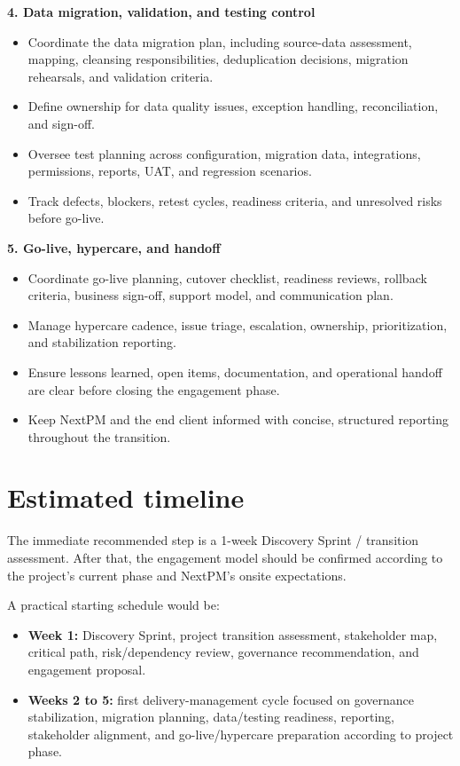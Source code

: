 \documentclass[11pt,a4paper]{article}
\begin{document}
\textbf{4. Data migration, validation, and testing control}\par

\begin{itemize}
\item Coordinate the data migration plan, including source-data assessment, mapping, cleansing responsibilities, deduplication decisions, migration rehearsals, and validation criteria.
\item Define ownership for data quality issues, exception handling, reconciliation, and sign-off.
\item Oversee test planning across configuration, migration data, integrations, permissions, reports, UAT, and regression scenarios.
\item Track defects, blockers, retest cycles, readiness criteria, and unresolved risks before go-live.
\end{itemize}

\textbf{5. Go-live, hypercare, and handoff}\par

\begin{itemize}
\item Coordinate go-live planning, cutover checklist, readiness reviews, rollback criteria, business sign-off, support model, and communication plan.
\item Manage hypercare cadence, issue triage, escalation, ownership, prioritization, and stabilization reporting.
\item Ensure lessons learned, open items, documentation, and operational handoff are clear before closing the engagement phase.
\item Keep NextPM and the end client informed with concise, structured reporting throughout the transition.
\end{itemize}

\section*{Estimated timeline}

The immediate recommended step is a 1-week Discovery Sprint / transition assessment. After that, the engagement model should be confirmed according to the project's current phase and NextPM's onsite expectations.\par

A practical starting schedule would be:\par

\begin{itemize}
\item \textbf{Week 1:} Discovery Sprint, project transition assessment, stakeholder map, critical path, risk/dependency review, governance recommendation, and engagement proposal.
\item \textbf{Weeks 2 to 5:} first delivery-management cycle focused on governance stabilization, migration planning, data/testing readiness, reporting, stakeholder alignment, and go-live/hypercare preparation according to project phase.
\end{itemize}
\end{document}
